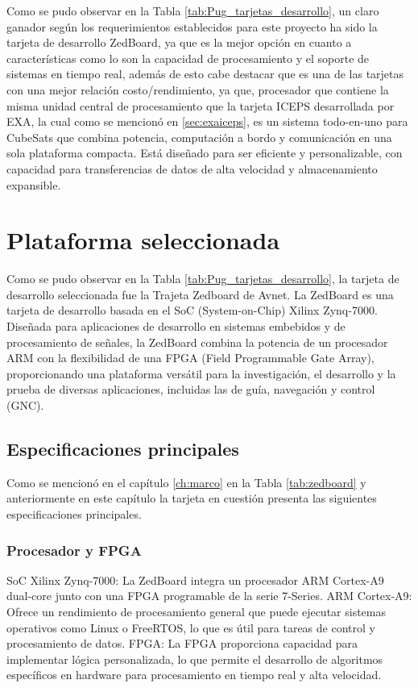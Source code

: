 Como se pudo observar en la Tabla \ref{tab:Pug_tarjetas_desarrollo}, un claro ganador según los requerimientos establecidos para este proyecto ha sido la tarjeta de desarrollo ZedBoard, ya que es la mejor opción en cuanto a características como lo son la capacidad de procesamiento y el soporte de sistemas en tiempo real, además de esto cabe destacar que es una de las tarjetas con una mejor relación costo/rendimiento, ya que, procesador que contiene la misma unidad central de procesamiento que la tarjeta ICEPS desarrollada por EXA, la cual como se mencionó en \ref{sec:exaiceps}, es un sistema todo-en-uno para CubeSats que combina potencia, computación a bordo y comunicación en una sola plataforma compacta. Está diseñado para ser eficiente y personalizable, con capacidad para transferencias de datos de alta velocidad y almacenamiento expansible.

\section{Plataforma seleccionada}

Como se pudo observar en la Tabla \ref{tab:Pug_tarjetas_desarrollo}, la tarjeta de desarrollo seleccionada fue la Trajeta Zedboard de Avnet. La ZedBoard es una tarjeta de desarrollo basada en el SoC (System-on-Chip) Xilinx Zynq-7000. Diseñada para aplicaciones de desarrollo en sistemas embebidos y de procesamiento de señales, la ZedBoard combina la potencia de un procesador ARM con la flexibilidad de una FPGA (Field Programmable Gate Array), proporcionando una plataforma versátil para la investigación, el desarrollo y la prueba de diversas aplicaciones, incluidas las de guía, navegación y control (GNC).

\subsection{Especificaciones principales}

Como se mencionó en el capítulo \ref{ch:marco} en la Tabla \ref{tab:zedboard} y anteriormente en este capítulo la tarjeta en cuestión presenta las siguientes especificaciones principales.

\subsubsection{Procesador y FPGA}
SoC Xilinx Zynq-7000: La ZedBoard integra un procesador ARM Cortex-A9 dual-core junto con una FPGA programable de la serie 7-Series.
ARM Cortex-A9: Ofrece un rendimiento de procesamiento general que puede ejecutar sistemas operativos como Linux o FreeRTOS, lo que es útil para tareas de control y procesamiento de datos.
FPGA: La FPGA proporciona capacidad para implementar lógica personalizada, lo que permite el desarrollo de algoritmos específicos en hardware para procesamiento en tiempo real y alta velocidad.
